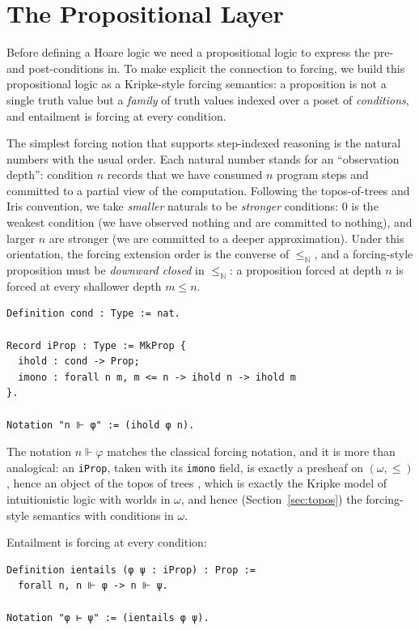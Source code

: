 \section{The Propositional Layer}
\label{sec:prop}

Before defining a Hoare logic we need a propositional logic to express
the pre- and post-conditions in.  To make explicit the connection to
forcing, we build this propositional logic as a Kripke-style forcing
semantics: a proposition is not a single truth value but a
\emph{family} of truth values indexed over a poset of
\emph{conditions}, and entailment is forcing at every condition.

The simplest forcing notion that supports step-indexed reasoning is
the natural numbers with the usual order.  Each natural number stands
for an ``observation depth'': condition $n$ records that we have
consumed $n$ program steps and committed to a partial view of the
computation.  Following the topos-of-trees and Iris convention, we
take \emph{smaller} naturals to be \emph{stronger} conditions: $0$ is
the weakest condition (we have observed nothing and are committed to
nothing), and larger $n$ are stronger (we are committed to a deeper
approximation).  Under this orientation, the forcing extension order
is the converse of $\le_\mathbb{N}$, and a forcing-style proposition
must be \emph{downward closed} in $\le_\mathbb{N}$: a proposition
forced at depth $n$ is forced at every shallower depth $m \le n$.

\begin{lstlisting}
Definition cond : Type := nat.

Record iProp : Type := MkProp {
  ihold : cond -> Prop;
  imono : forall n m, m <= n -> ihold n -> ihold m
}.

Notation "n ⊩ φ" := (ihold φ n).
\end{lstlisting}

The notation $n \Vdash \varphi$ matches the classical forcing notation,
and it is more than analogical: an \texttt{iProp}, taken with its
\texttt{imono} field, is exactly a presheaf on $(\omega, \le)$, hence
an object of the topos of trees \cite{birkedal-et-al-2012}, which
is exactly the Kripke model of intuitionistic logic with worlds in
$\omega$, and hence (Section~\ref{sec:topos}) the forcing-style
semantics with conditions in $\omega$.

Entailment is forcing at every condition:
\begin{lstlisting}
Definition ientails (φ ψ : iProp) : Prop :=
  forall n, n ⊩ φ -> n ⊩ ψ.

Notation "φ ⊢ ψ" := (ientails φ ψ).
\end{lstlisting}

